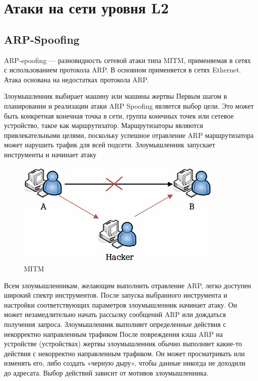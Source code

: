 \documentclass[a4paper, 12pt]{report}
\begin{document}
	\chapter{Атаки на сети уровня L2}
		\section{ARP-Spoofing}
		
		ARP-spoofing — разновидность сетевой атаки типа MITM, применяемая в сетях с использованием протокола ARP. В основном применяется в сетях Ethernet. Атака основана на недостатках протокола ARP.
		
		Злоумышленник выбирает машину или машины жертвы
		Первым шагом в планировании и реализации атаки ARP Spoofing является выбор цели. Это может быть конкретная конечная точка в сети, группа конечных точек или сетевое устройство, такое как маршрутизатор. Маршрутизаторы являются привлекательными целями, поскольку успешное отравление ARP маршрутизатора может нарушить трафик для всей подсети.
		Злоумышленник запускает инструменты и начинает атаку
		\begin{figure}[h!]
			\centering
			\includegraphics[scale=0.45]{img/2.jpg}
			\caption{MITM}
			\label{chargets}
		\end{figure}
		Всем злоумышленникам, желающим выполнить отравление ARP, легко доступен широкий спектр инструментов. После запуска выбранного инструмента и настройки соответствующих параметров злоумышленник начинает атаку. Он может незамедлительно начать рассылку сообщений ARP или дождаться получения запроса.
		Злоумышленник выполняет определенные действия с некорректно направленным трафиком
		После повреждения кэша ARP на устройстве (устройствах) жертвы злоумышленник обычно выполняет какие-то действия с некорректно направленным трафиком. Он может просматривать или изменять его, либо создать «черную дыру», чтобы данные никогда не доходили до адресата. Выбор действий зависит от мотивов злоумышленника.
		
	
\end{document}
